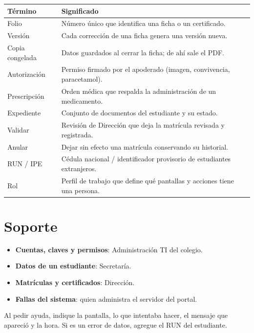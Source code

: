 \begin{longtable}{@{}p{}p{}@{}}
\toprule
\textbf{Término} & \textbf{Significado}\\
\midrule
Folio & Número único que identifica una ficha o un certificado.\\
Versión & Cada corrección de una ficha genera una versión nueva.\\
Copia congelada & Datos guardados al cerrar la ficha; de ahí sale el PDF.\\
Autorización & Permiso firmado por el apoderado (imagen, convivencia,
  paracetamol).\\
Prescripción & Orden médica que respalda la administración de un medicamento.\\
Expediente & Conjunto de documentos del estudiante y su estado.\\
Validar & Revisión de Dirección que deja la matrícula revisada y registrada.\\
Anular & Dejar sin efecto una matrícula conservando su historial.\\
RUN / IPE & Cédula nacional / identificador provisorio de estudiantes
  extranjeros.\\
Rol & Perfil de trabajo que define qué pantallas y acciones tiene una persona.\\
\bottomrule
\end{longtable}

\section{Soporte}

\begin{itemize}[leftmargin=*,itemsep=0.2em]
\item \textbf{Cuentas, claves y permisos}: Administración TI del colegio.
\item \textbf{Datos de un estudiante}: Secretaría.
\item \textbf{Matrículas y certificados}: Dirección.
\item \textbf{Fallas del sistema}: quien administra el servidor del portal.
\end{itemize}

Al pedir ayuda, indique la pantalla, lo que intentaba hacer, el mensaje que
apareció y la hora. Si es un error de datos, agregue el RUN del estudiante.
